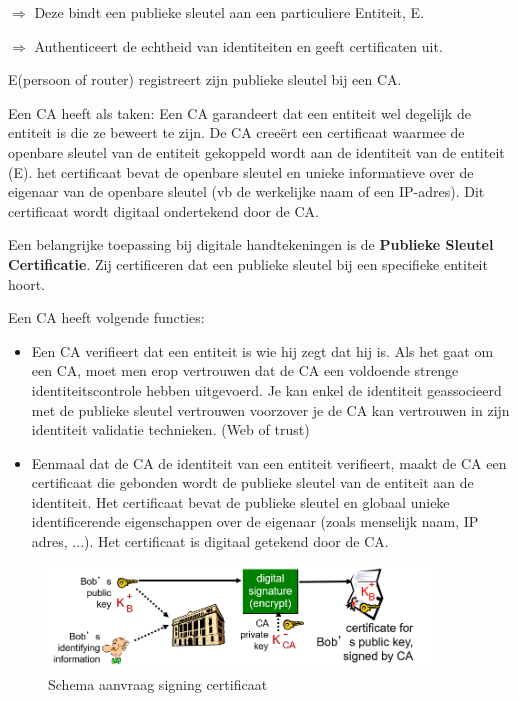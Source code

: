 
\noindent $\Rightarrow$ Deze bindt een publieke sleutel aan een particuliere Entiteit, E.

\noindent $\Rightarrow$ Authenticeert de echtheid van identiteiten en geeft certificaten uit.

\noindent E(persoon of router) registreert zijn publieke sleutel bij een CA.

\noindent Een CA heeft als taken:
\bi
\itf Een CA garandeert dat een entiteit wel degelijk de entiteit is die ze beweert te zijn.
\itf De CA creeërt een certificaat waarmee de openbare sleutel van de entiteit gekoppeld wordt aan de identiteit van de entiteit (E).
    \bi
    \itf het certificaat bevat de openbare sleutel en unieke informatieve over de eigenaar van de openbare sleutel (vb de werkelijke naam of een IP-adres). Dit certificaat wordt digitaal ondertekend door de CA. 
    \ei
\ei

\newpage


Een belangrijke toepassing bij digitale handtekeningen is de \textbf{Publieke Sleutel Certificatie}. Zij certificeren dat een publieke sleutel bij een specifieke entiteit hoort.

\noindent Een CA heeft volgende functies:
\begin{itemize}
\item Een CA verifieert dat een entiteit is wie hij zegt dat hij is. Als het gaat om een CA, moet men erop vertrouwen dat de CA een voldoende strenge identiteitscontrole hebben uitgevoerd. Je kan enkel de identiteit geassocieerd met de publieke sleutel vertrouwen voorzover je de CA kan vertrouwen in zijn identiteit validatie technieken. (Web of trust)
\item Eenmaal dat de CA de identiteit van een entiteit verifieert, maakt de CA een certificaat die gebonden wordt de publieke sleutel van de entiteit aan de identiteit. Het certificaat bevat de publieke sleutel en globaal unieke identificerende eigenschappen over de eigenaar (zoals menselijk naam, IP adres, ...). Het certificaat is digitaal getekend door de CA.
\end{itemize}

\begin{figure}[h]
    \centering
    \includegraphics[width=4in]{./img/imghfdst8/hfdst8puntje11.png}
    \caption{Schema aanvraag signing certificaat  }      
    \label{fig:Schema aanvraag signing certificaat }
\end{figure}

